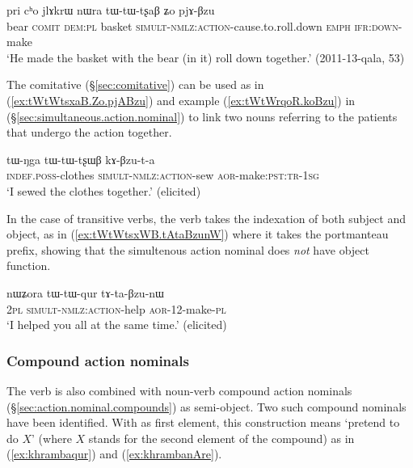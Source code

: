 \begin{exe}
	\ex \label{ex:tWtWtsxaB.Zo.pjABzu}
	\gll  pri cʰo jlɤkrɯ nɯra tɯ-tɯ-tʂaβ ʑo pjɤ-βzu  \\
	bear \textsc{comit} \textsc{dem}:\textsc{pl}  basket  \textsc{simult}-\textsc{nmlz}:\textsc{action}-cause.to.roll.down \textsc{emph} \textsc{ifr}:\textsc{down}-make \\
	\glt `He made the basket with the bear (in it) roll down together.' (2011-13-qala, 53) 
\end{exe}

The comitative (§\ref{sec:comitative}) can be used as in (\ref{ex:tWtWtsxaB.Zo.pjABzu}) and example  (\ref{ex:tWtWrqoR.koBzu}) in  (§\ref{sec:simultaneous.action.nominal}) to link two nouns referring to the patients that undergo the action together.

\begin{exe}
	\ex \label{ex:tWtWtsxWB.kABzuta}
	\gll   tɯ-ŋga tɯ-tɯ-tʂɯβ kɤ-βzu-t-a \\
	\textsc{indef}.\textsc{poss}-clothes \textsc{simult}-\textsc{nmlz}:\textsc{action}-sew \textsc{aor}-make:\textsc{pst}:\textsc{tr}-\textsc{1sg} \\
	\glt `I sewed the clothes together.' (elicited)
\end{exe}

In the case of transitive verbs, the verb  takes the indexation of both subject and object, as in (\ref{ex:tWtWtsxWB.tAtaBzunW}) where it takes the portmanteau  prefix, showing that the simultenous action nominal does \textit{not} have object function.

\begin{exe}
	\ex \label{ex:tWtWtsxWB.tAtaBzunW}
	\gll nɯʑora tɯ-tɯ-qur tɤ-ta-βzu-nɯ \\
	\textsc{2pl} \textsc{simult}-\textsc{nmlz}:\textsc{action}-help \textsc{aor}-1\fl{}2-make-\textsc{pl} \\
	\glt `I helped you all at the same time.' (elicited)
\end{exe}  


\subsubsection{Compound action nominals} \label{sec:compound.action.nominal.Bzu}
The verb  is also combined with noun-verb compound action nominals (§\ref{sec:action.nominal.compounds}) as semi-object. Two such compound nominals have been identified. With  as first element, this construction means `pretend to do $X$' (where $X$ stands for the second element of the compound) as in (\ref{ex:khrambaqur}) and (\ref{ex:khrambanAre}). 

